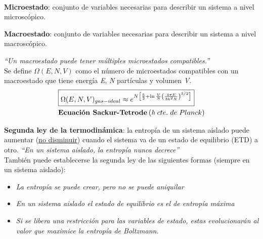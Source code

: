 \hspace{1px}
\\

\textbf{Microestado}: conjunto de variables necesarias para describir un sistema a nivel microscópico.

\textbf{Macroestado}: conjunto de variables necesarias para describir un sistema a nivel macroscópico.

\textit{\enquote{Un macroestado puede tener múltiples microestados compatibles.}}
\\

Se define $\Omega (E, N, V)$ como el número de microestados compatibles con un macroestado que tiene energía \textit{E}, \textit{N} partículas y volumen \textit{V}.
\\

\begin{equation}
    \label{eq:Sackur-Tetrode}
    \begin{split}
     & \boxed{\Omega (E, N, V)_{gas-ideal} \approx e^{N \left[\frac{5}{2} + \ln{\frac{V}{N} \left( \frac{4 \pi E}{3h^2N} \right)^{3/2} } \right]}} \\
     & \textbf{Ecuación Sackur-Tetrode} \hspace{2px} (\textit{h} \hspace{3px} cte.\hspace{3px} de\hspace{3px} Planck)
    \end{split}
\end{equation}
\hspace{1px}



\textbf{Segunda ley de la termodinámica}: la entropía de un sistema aislado puede aumentar (\underline{no disminuir}) cuando el sistema va de un estado de equilibrio (ETD) a otro. \textit{\enquote{En un sistema aislado, la entropía nunca decrece}}
\\

También puede establecerse la segunda ley de las siguientes formas (siempre en un sistema aislado):
\begin{itemize}
    \item \textit{La entropía se puede crear, pero no se puede aniquilar}
    \item \textit{En un sistema aislado el estado de equilibrio es el de entropía máxima}
    \item \textit{Si se libera una restricción para las variables de estado, estas evolucionarán al valor que maximice la entropía de Boltzmann.}
\end{itemize}

